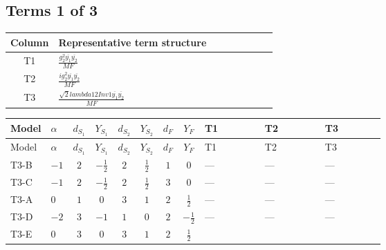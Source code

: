 \documentclass[8pt]{article}
\begin{document}
\begin{landscape}
\subsection*{Terms 1 of 3}
\begin{center}
\begin{tabular}{@{}c >{\raggedright\arraybackslash}p{0.82\linewidth}@{}}
\toprule
Column & Representative term structure \\
\midrule
T1 & \(\displaystyle \frac{g_{2}^{2} \overline{y_{1}} \overline{y_{2}}}{MF}\) \\
\midrule
T2 & \(\displaystyle \frac{i g_{2}^{2} \overline{y_{1}} \overline{y_{2}}}{MF}\) \\
\midrule
T3 & \(\displaystyle \frac{\sqrt{2} lambda12Inv1 \overline{y_{1}} \overline{y_{2}}}{MF}\) \\
\midrule
\bottomrule
\end{tabular}
\end{center}
\smallskip
\tiny
\begin{longtable}{@{}llcccccc >{\raggedright\arraybackslash}p{0.21\linewidth} >{\raggedright\arraybackslash}p{0.21\linewidth} >{\raggedright\arraybackslash}p{0.21\linewidth}@{}}
\toprule
Model & $\alpha$ & $d_{S_1}$ & $Y_{S_1}$ & $d_{S_2}$ & $Y_{S_2}$ & $d_F$ & $Y_F$ & T1 & T2 & T3 \\
\midrule
\endfirsthead
\toprule
Model & $\alpha$ & $d_{S_1}$ & $Y_{S_1}$ & $d_{S_2}$ & $Y_{S_2}$ & $d_F$ & $Y_F$ & T1 & T2 & T3 \\
\midrule
\endhead
T3-B & $-1$ & $2$ & $-\frac{1}{2}$ & $2$ & $\frac{1}{2}$ & $1$ & $0$ & --- & --- & --- \\
\midrule
T3-C & $-1$ & $2$ & $-\frac{1}{2}$ & $2$ & $\frac{1}{2}$ & $3$ & $0$ & --- & --- & --- \\
\midrule
T3-A & $0$ & $1$ & $0$ & $3$ & $1$ & $2$ & $\frac{1}{2}$ & --- & --- & --- \\
\midrule
T3-D & $-2$ & $3$ & $-1$ & $1$ & $0$ & $2$ & $-\frac{1}{2}$ & --- & --- & --- \\
\midrule
T3-E & $0$ & $3$ & $0$ & $3$ & $1$ & $2$ & $\frac{1}{2}$ & \scriptsize\adjustbox{max width=\linewidth}{$\begin{gathered} \frac{g_{2}^{2} \overline{y_{1}} \overline{y_{2}}}{2 MF}\end{gathered}$} & \scriptsize\adjustbox{max width=\linewidth}{$\begin{gathered} \frac{i g_{2}^{2} \overline{y_{1}} \overline{y_{2}}}{2 MF}\end{gathered}$} & \scriptsize\adjustbox{max width=\linewidth}{$\begin{gathered} - \frac{\sqrt{2} lambda12Inv1 \overline{y_{1}} \overline{y_{2}}}{4 MF}\end{gathered}$} \\
\midrule
\bottomrule
\end{longtable}
\clearpage

\end{landscape}
\end{document}
